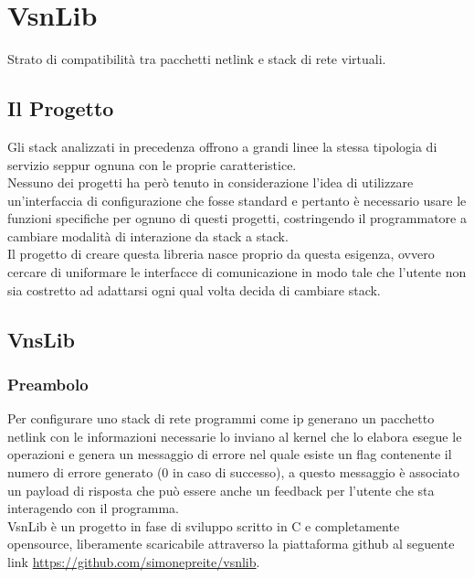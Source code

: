

\chapter{VsnLib}                %
\lhead[\fancyplain{}{\bfseries\thepage}]{\fancyplain{}{\bfseries\rightmark}}
Strato di compatibilit\`a tra pacchetti netlink e stack di rete virtuali.

\section{Il Progetto}                 %
Gli stack analizzati in precedenza offrono a grandi linee la stessa tipologia di servizio seppur ognuna con le proprie caratteristice.\\
Nessuno dei progetti ha per\`o tenuto in considerazione l'idea di utilizzare un'interfaccia di configurazione che fosse standard e pertanto \`e necessario usare le funzioni specifiche per ognuno di questi progetti, costringendo il programmatore a cambiare modalit\`a di interazione da stack a stack.\\
Il progetto di creare questa libreria nasce proprio da questa esigenza, ovvero cercare di uniformare le interfacce di comunicazione in modo tale che l'utente non sia costretto ad adattarsi ogni qual volta decida di cambiare stack.\\
\section{VnsLib}
\subsection{Preambolo}
Per configurare uno stack di rete programmi come ip generano un pacchetto netlink con le informazioni necessarie lo inviano al kernel che lo elabora esegue le operazioni e genera un messaggio di errore nel quale esiste un flag contenente il numero di errore generato (0 in caso di successo), a questo messaggio \`e associato un payload di risposta che pu\`o essere anche un feedback per l'utente che sta interagendo con il programma.\\
VsnLib \`e un progetto in fase di sviluppo scritto in C e completamente opensource, liberamente scaricabile attraverso la piattaforma github al seguente link \url{https://github.com/simonepreite/vsnlib}.

